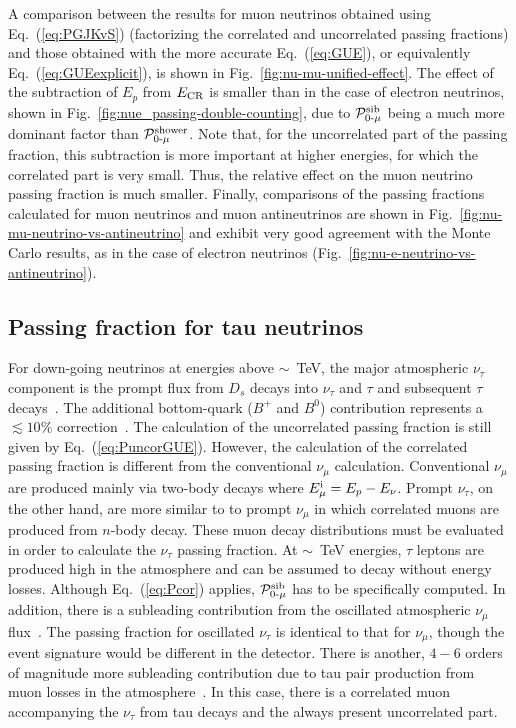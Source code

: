 \documentclass[aps,prd,showpacs,letterpaper,onecolumn,longbibliography,superscriptaddress,notitlepage,nofootinbib]{revtex4-1}%
\newcommand{\Emi}{E_{\mu}^{\rm i}}
\newcommand{\ECR}{E_{\rm CR}}
\newcommand{\Prob}{{\cal P}}
\newcommand{\Pzmproto}{\Prob_{0\text{-}\mu}^{\rm shower}}
\newcommand{\Pzmsib}{\Prob_{0\text{-}\mu}^{\rm sib}}
\begin{document}
A comparison between the results for muon neutrinos obtained using Eq.~(\ref{eq:PGJKvS}) (factorizing the correlated and uncorrelated passing fractions) and those obtained with the more accurate Eq.~(\ref{eq:GUE}), or equivalently Eq.~(\ref{eq:GUEexplicit}), is shown in Fig.~\ref{fig:nu-mu-unified-effect}. The effect of the subtraction of $E_p$ from $\ECR$ is smaller than in the case of electron neutrinos, shown in Fig.~\ref{fig:nue_passing-double-counting}, due to $\Pzmsib$ being a much more dominant factor than $\Pzmproto$. Note that, for the uncorrelated part of the passing fraction, this subtraction is more important at higher energies, for which the correlated part is very small. Thus, the relative effect on the muon neutrino passing fraction is much smaller. Finally, comparisons of the passing fractions calculated for muon neutrinos and muon antineutrinos are shown in Fig.~\ref{fig:nu-mu-neutrino-vs-antineutrino} and exhibit very good agreement with the Monte Carlo results, as in the case of electron neutrinos (Fig.~\ref{fig:nu-e-neutrino-vs-antineutrino}). 

\subsection{Passing fraction for tau neutrinos}
\label{sec:pfnutau}

For down-going neutrinos at energies above $\sim$~TeV, the major atmospheric $\nu_\tau$ component is the prompt flux from $D_s$ decays into $\nu_\tau$ and $\tau$ and subsequent $\tau$ decays~\cite{Pasquali:1998xf}. The additional bottom-quark ($B^+$ and $B^0$) contribution represents a $\lesssim 10\%$ correction~\cite{Pasquali:1998xf, Bhattacharya:2016jce}. The calculation of the uncorrelated passing fraction is still given by Eq.~(\ref{eq:PuncorGUE}). However, the calculation of the correlated passing fraction is different from the conventional $\nu_\mu$ calculation. Conventional $\nu_\mu$ are produced mainly via two-body decays where $\Emi = E_p - E_\nu$. Prompt $\nu_\tau$, on the other hand, are more similar to to prompt $\nu_\mu$ in which correlated muons are produced from $n$-body decay. These muon decay distributions must be evaluated in order to calculate the $\nu_\tau$ passing fraction. At $\sim$~TeV energies, $\tau$ leptons are produced high in the atmosphere and can be assumed to decay without energy losses. Although Eq.~(\ref{eq:Pcor}) applies, $\Pzmsib$ has to be specifically computed. In addition, there is a subleading contribution from the oscillated atmospheric $\nu_\mu$ flux~\cite{Martin:2003us, Bulmahn:2010pg}. The passing fraction for oscillated $\nu_\tau$ is identical to that for $\nu_\mu$, though the event signature would be different in the detector. There is another, $4-6$ orders of magnitude more subleading contribution due to tau pair production from muon losses in the atmosphere~\cite{Bulmahn:2010pg}. In this case, there is a correlated muon accompanying the $\nu_\tau$ from tau decays and the always present uncorrelated part.
\end{document}
